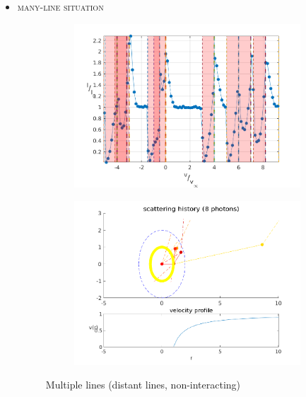 \documentclass[../main/main.tex]{subfiles}
\begin{document}
\begin{itemize}
\newpage
\item \textsc{many-line situation}
	\begin{figure}[H]
	\centering
	\hspace*{-0.5in}
	\begin{subfigure}{.6\textwidth}
	\includegraphics[width=1\textwidth]{../../two_resonance_lines/figures/multiple_lines_MANY.png}
	\end{subfigure}%
	\begin{subfigure}{.6\textwidth}
	\includegraphics[width=1\textwidth]{../../two_resonance_lines/figures/multiple_lines_photon_path_MANY.png}
	\end{subfigure}
	\caption{Multiple lines (distant lines, non-interacting)}
	\label{multiple_lines_MANY}
	\end{figure}
\end{itemize}
\end{document}
